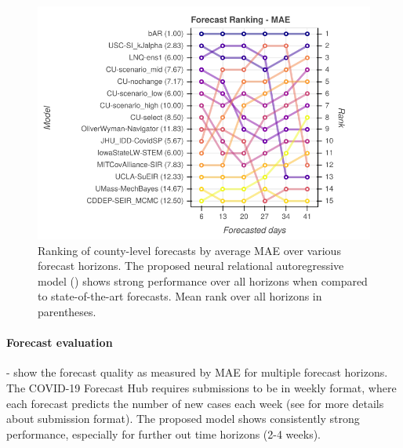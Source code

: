 \begin{figure}[t]
  \centering
  \includegraphics[width=\columnwidth]{img/us_rank_mae.png}
  \vspace{-2ex}
\caption{Ranking of county-level forecasts by average MAE over various forecast horizons. The proposed neural relational autoregressive model (\bAR) shows strong performance over all horizons when compared to state-of-the-art forecasts. Mean rank over all horizons in parentheses.}
\label{fig:ranking-covidhub-mae}
\end{figure}


\paragraph{Forecast evaluation}  -  show the forecast quality as measured by MAE for multiple forecast horizons.  
The COVID-19 Forecast Hub requires submissions to be in weekly format, where each forecast predicts the number of new cases each week (see \citep{reichlab} for more details about submission format).  
The proposed \bAR model shows consistently strong performance, especially for further out time horizons (2-4 weeks).  



